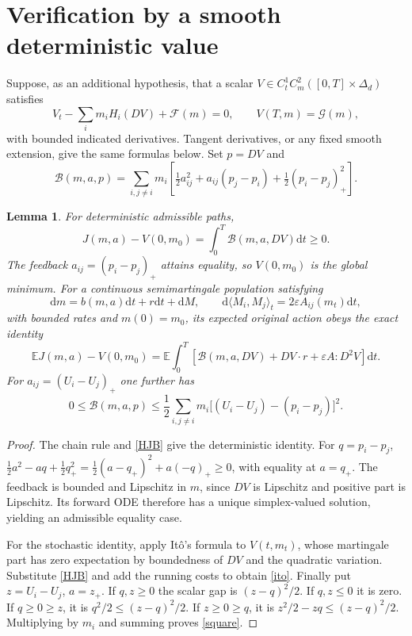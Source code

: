 \documentclass[11pt]{article}
\newtheorem{lemma}[theorem]{Lemma}
\newcommand{\E}{\mathbb E}
\newcommand{\dd}{\mathrm d}
\begin{document}
\section{Verification by a smooth deterministic value}
Suppose, as an additional hypothesis, that a scalar $V\in C^1_tC^2_m([0,T]\times\Delta_d)$ satisfies
\begin{equation}\label{HJB}
 V_t-\sum_i m_iH_i(DV)+\mathcal F(m)=0,\qquad V(T,m)=\mathcal G(m),
\end{equation}
with bounded indicated derivatives. Tangent derivatives, or any fixed smooth extension, give the same formulas below. Set $p=DV$ and
\[
 \mathcal B(m,a,p)=\sum_{i,j\ne i}m_i\left[
 \tfrac12a_{ij}^2+a_{ij}(p_j-p_i)+\tfrac12(p_i-p_j)_+^2\right].
\]
\begin{lemma}\label{certificate}
For deterministic admissible paths,
\[
 J(m,a)-V(0,m_0)=\int_0^T\mathcal B(m,a,DV)\dd t\ge0.
\]
The feedback $a_{ij}=(p_i-p_j)_+$ attains equality, so $V(0,m_0)$ is the global minimum. For a continuous semimartingale population satisfying
\[
 \dd m=b(m,a)\dd t+r\dd t+\dd M,\qquad
 \dd\langle M_i,M_j\rangle_t=2\varepsilon A_{ij}(m_t)\dd t,
\]
with bounded rates and $m(0)=m_0$, its expected original action obeys the exact identity
\begin{equation}\label{ito}
 \E J(m,a)-V(0,m_0)
 =\E\int_0^T\left[\mathcal B(m,a,DV)+DV\cdot r+\varepsilon A:D^2V\right]\dd t.
\end{equation}
For $a_{ij}=(U_i-U_j)_+$ one further has
\begin{equation}\label{square}
 0\le\mathcal B(m,a,p)\le\frac12\sum_{i,j\ne i}m_i\big[(U_i-U_j)-(p_i-p_j)\big]^2.
\end{equation}
\end{lemma}
\begin{proof}
The chain rule and \eqref{HJB} give the deterministic identity. For $q=p_i-p_j$,
$\frac12a^2-aq+\frac12q_+^2=\frac12(a-q_+)^2+a(-q)_+\ge0$, with equality at $a=q_+$. The feedback is bounded and Lipschitz in $m$, since $DV$ is Lipschitz and positive part is Lipschitz. Its forward ODE therefore has a unique simplex-valued solution, yielding an admissible equality case.

For the stochastic identity, apply It\^o's formula to $V(t,m_t)$, whose martingale part has zero expectation by boundedness of $DV$ and the quadratic variation. Substitute \eqref{HJB} and add the running costs to obtain \eqref{ito}. Finally put $z=U_i-U_j$, $a=z_+$. If $q,z\ge0$ the scalar gap is $(z-q)^2/2$. If $q,z\le0$ it is zero. If $q\ge0\ge z$, it is $q^2/2\le(z-q)^2/2$. If $z\ge0\ge q$, it is $z^2/2-zq\le(z-q)^2/2$. Multiplying by $m_i$ and summing proves \eqref{square}.
\end{proof}
\end{document}
